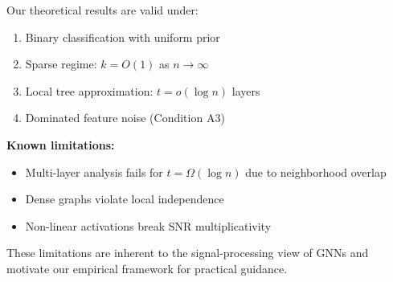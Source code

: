 \begin{remark}
\label{rem:scope_rigorous}
Our theoretical results are valid under:
\begin{enumerate}
    \item Binary classification with uniform prior
    \item Sparse regime: $k = O(1)$ as $n \to \infty$
    \item Local tree approximation: $t = o(\log n)$ layers
    \item Dominated feature noise (Condition A3)
\end{enumerate}

\textbf{Known limitations:}
\begin{itemize}
    \item Multi-layer analysis fails for $t = \Omega(\log n)$ due to neighborhood overlap
    \item Dense graphs violate local independence
    \item Non-linear activations break SNR multiplicativity
\end{itemize}

These limitations are inherent to the signal-processing view of GNNs and motivate our empirical framework for practical guidance.
\end{remark}

